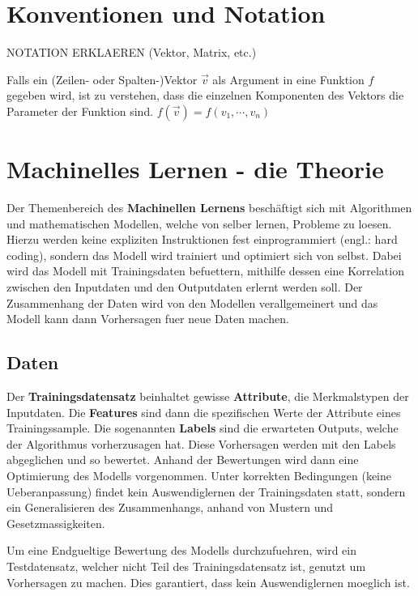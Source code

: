 \documentclass[../main]{subfiles}
\begin{document}
\section{Konventionen und Notation}

NOTATION ERKLAEREN (Vektor, Matrix, etc.)
\par\bigskip
Falls ein (Zeilen- oder Spalten-)Vektor $\vec{v}$ als Argument in eine Funktion $f$ gegeben wird, ist zu verstehen,
dass die einzelnen Komponenten des Vektors die Parameter der Funktion sind.
$f(\vec{v})=f(v_1,\cdots,v_n)$

\section{Machinelles Lernen - die Theorie}

Der Themenbereich des \textbf{Machinellen Lernens} beschäftigt sich mit Algorithmen und mathematischen Modellen, welche von selber lernen, Probleme zu loesen.
Hierzu werden keine expliziten Instruktionen fest einprogrammiert (engl.: hard coding), sondern das Modell wird trainiert und optimiert sich von selbst.
Dabei wird das Modell mit Trainingsdaten befuettern, mithilfe dessen eine Korrelation zwischen den Inputdaten und den Outputdaten erlernt werden soll.
Der Zusammenhang der Daten wird von den Modellen verallgemeinert und das Modell kann dann Vorhersagen fuer neue Daten machen. 

\subsection{Daten}

Der \textbf{Trainingsdatensatz} beinhaltet gewisse \textbf{Attribute}, die Merkmalstypen der Inputdaten.
Die \textbf{Features} sind dann die spezifischen Werte der Attribute eines Trainingssample.
Die sogenannten \textbf{Labels} sind die erwarteten Outputs, welche der Algorithmus vorherzusagen hat.
Diese Vorhersagen werden mit den Labels abgeglichen und so bewertet.
Anhand der Bewertungen wird dann eine Optimierung des Modells vorgenommen.
Unter korrekten Bedingungen (keine Ueberanpassung) findet kein Auswendiglernen der Trainingsdaten statt,
sondern ein Generalisieren des Zusammenhangs, anhand von Mustern und Gesetzmassigkeiten.

Um eine Endgueltige Bewertung des Modells durchzufuehren, wird ein Testdatensatz, welcher nicht Teil des Trainingsdatensatz ist, genutzt um Vorhersagen zu machen.
Dies garantiert, dass kein Auswendiglernen moeglich ist.
\end{document}
